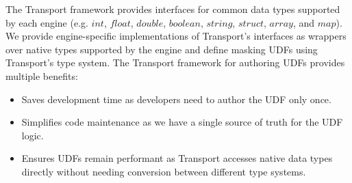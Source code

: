 The Transport framework provides interfaces for common data types supported by each engine (e.g. $int$, $float$, $double$, $boolean$, $string$, $struct$, $array$, and $map$). We provide engine-specific implementations of Transport's interfaces as wrappers over native types supported by the engine and define masking UDFs using Transport's type system. The Transport framework for authoring UDFs provides multiple benefits:
\begin{itemize}
    \item Saves development time as developers need to author the UDF only once. 
    \item Simplifies code maintenance as we have a single source of truth for the UDF logic.
    \item Ensures UDFs remain performant as Transport accesses native data types directly without needing conversion between different type systems. 
\end{itemize}
